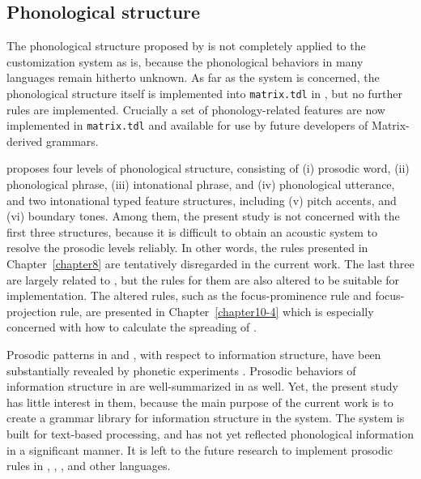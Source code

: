 \subsection{Phonological structure}
\label{9:ssec:phonology}


The phonological structure proposed by \citet{bildhauer:07} is not
completely applied to the customization system as is, because the
phonological behaviors in many languages remain hitherto unknown.  As
far as the \lingo {} system is concerned, the
phonological structure itself is implemented into \texttt{matrix.tdl}
in , but no further rules are implemented.  Crucially a set
of phonology-related features are now implemented in
\texttt{matrix.tdl} and available for use by future developers of
Matrix-derived grammars.


\citet{bildhauer:07} proposes four levels of phonological structure,
consisting of (i) prosodic word, (ii) phonological phrase, (iii)
intonational phrase, and (iv) phonological utterance, and two
intonational typed feature structures, including (v) pitch accents,
and (vi) boundary tones. Among them, the present study is not
concerned with the first three structures, because it is difficult to
obtain an acoustic system to resolve the prosodic levels reliably.  In
other words, the rules presented in Chapter~\ref{chapter8}
 are tentatively disregarded in the
current work. The last three are largely related to , but the rules for them are also altered to be suitable
for implementation. The altered rules, such as the focus-prominence
rule and focus-projection rule, are presented in
Chapter~\ref{chapter10-4} which is especially concerned with how to
calculate the spreading of .


Prosodic patterns in  and , with respect to
information structure, have been substantially revealed by phonetic
experiments \citep{jun:etal:07,ueyama:jun:98,jun:lee:98}. Prosodic
behaviors of information structure in  are
well-summarized in \citet{bildhauer:07} as well. Yet, the present
study has little interest in them, because the main purpose of the
current work is to create a grammar library for information structure
in the \lingo {} system. The system is built for
text-based processing, and has not yet reflected phonological
information in a significant manner. It is left to the future research
to implement prosodic rules in , ,
, and other languages.






